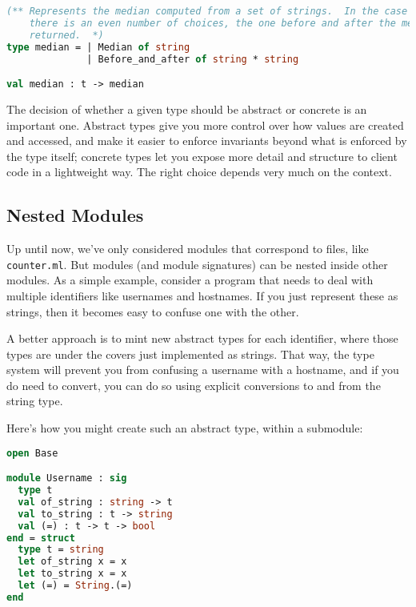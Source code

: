 \begin{lstlisting}[language=Caml]
(** Represents the median computed from a set of strings.  In the case where
    there is an even number of choices, the one before and after the median is
    returned.  *)
type median = | Median of string
              | Before_and_after of string * string

val median : t -> median
\end{lstlisting}

The decision of whether a given type should be abstract or concrete is
an important one. Abstract types give you more control over how values
are created and accessed, and make it easier to enforce invariants
beyond what is enforced by the type itself; concrete types let you
expose more detail and structure to client code in a lightweight way.
The right choice depends very much on the context.

\hypertarget{nested-modules}{%
\subsection{Nested Modules}\label{nested-modules}}

Up until now, we've only considered modules that correspond to files,
like \passthrough{\lstinline!counter.ml!}. But modules (and module
signatures) can be nested inside other modules. As a simple example,
consider a program that needs to deal with multiple identifiers like
usernames and hostnames. If you just represent these as strings, then it
becomes easy to confuse one with the other.

A better approach is to mint new abstract types for each identifier,
where those types are under the covers just implemented as strings. That
way, the type system will prevent you from confusing a username with a
hostname, and if you do need to convert, you can do so using explicit
conversions to and from the string type.

Here's how you might create such an abstract type, within a submodule:

\begin{lstlisting}[language=Caml]
open Base

module Username : sig
  type t
  val of_string : string -> t
  val to_string : t -> string
  val (=) : t -> t -> bool
end = struct
  type t = string
  let of_string x = x
  let to_string x = x
  let (=) = String.(=)
end
\end{lstlisting}

